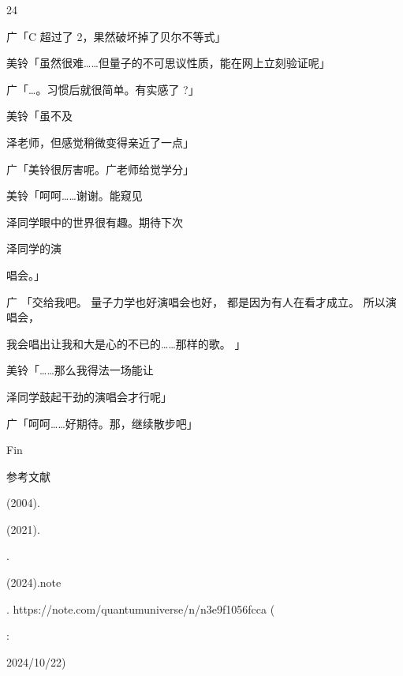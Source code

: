 24\par
广「C 超过了 2，果然破坏掉了贝尔不等式」\par
美铃「虽然很难……但量子的不可思议性质，能在网上立刻验证呢」\par
广「…。习惯后就很简单。有实感了 ?」\par
美铃「虽不及\par
泽老师，但感觉稍微变得亲近了一点」\par
广「美铃很厉害呢。广老师给觉学分」\par
美铃「呵呵……谢谢。能窥见\par
泽同学眼中的世界很有趣。期待下次\par
泽同学的演\par
唱会。」\par
广 「交给我吧。 量子力学也好演唱会也好， 都是因为有人在看才成立。 所以演唱会，\par
我会唱出让我和大是心的不已的……那样的歌。 」\par
美铃「……那么我得法一场能让\par
泽同学鼓起干劲的演唱会才行呢」\par
广「呵呵……好期待。那，继续散步吧」\par
Fin\par
参考文献\par
[1]\par
(2004).\par
[2]\par
(2021).\par
.\par
[3]\par
(2024).note\par
. https://note.com/quantumuniverse/n/n3e9f1056fcca (\par
:\par
2024/10/22)\par

